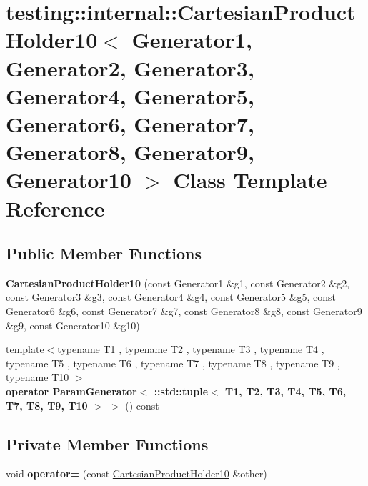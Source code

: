 \hypertarget{classtesting_1_1internal_1_1_cartesian_product_holder10}{}\section{testing\+:\+:internal\+:\+:Cartesian\+Product\+Holder10$<$ Generator1, Generator2, Generator3, Generator4, Generator5, Generator6, Generator7, Generator8, Generator9, Generator10 $>$ Class Template Reference}
\label{classtesting_1_1internal_1_1_cartesian_product_holder10}
\subsection*{Public Member Functions}
\begin{DoxyCompactItemize}
\item 
\mbox{\label{classtesting_1_1internal_1_1_cartesian_product_holder10_a3255f824dd20e02b8bb718bb7d3d3634}} 
{\bfseries Cartesian\+Product\+Holder10} (const Generator1 \&g1, const Generator2 \&g2, const Generator3 \&g3, const Generator4 \&g4, const Generator5 \&g5, const Generator6 \&g6, const Generator7 \&g7, const Generator8 \&g8, const Generator9 \&g9, const Generator10 \&g10)
\item 
\mbox{\label{classtesting_1_1internal_1_1_cartesian_product_holder10_a1c9f9e026696dd2618bb7e9e19daf239}} 
{\footnotesize template$<$typename T1 , typename T2 , typename T3 , typename T4 , typename T5 , typename T6 , typename T7 , typename T8 , typename T9 , typename T10 $>$ }\\{\bfseries operator Param\+Generator$<$ \+::std\+::tuple$<$ T1, T2, T3, T4, T5, T6, T7, T8, T9, T10 $>$ $>$} () const
\end{DoxyCompactItemize}
\subsection*{Private Member Functions}
\begin{DoxyCompactItemize}
\item 
\mbox{\label{classtesting_1_1internal_1_1_cartesian_product_holder10_adde49149fdebd8311645ddae469a4f89}} 
void {\bfseries operator=} (const \mbox{\hyperlink{classtesting_1_1internal_1_1_cartesian_product_holder10}{Cartesian\+Product\+Holder10}} \&other)
\end{DoxyCompactItemize}
